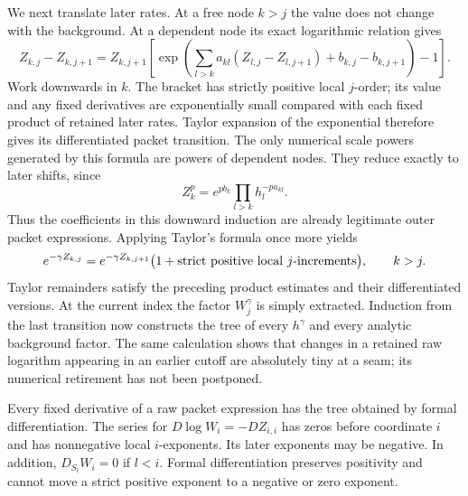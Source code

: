We next translate later rates.  At a free node $k>j$ the value does not
change with the background.  At a dependent node its exact logarithmic
relation gives
\begin{equation}
 Z_{k,j}-Z_{k,j+1}
 =Z_{k,j+1}\left[
 \exp\left(\sum_{l>k}a_{kl}(Z_{l,j}-Z_{l,j+1})
                   +b_{k,j}-b_{k,j+1}\right)-1\right].
 \label{eq:calculus-rate-difference}
\end{equation}
Work downwards in $k$.  The bracket has strictly positive local $j$-order;
its value and any fixed derivatives are exponentially small compared with
each fixed product of retained later rates.  Taylor expansion of the
exponential therefore gives its differentiated packet transition.
The only numerical scale powers generated by this formula are powers of
dependent nodes.  They reduce exactly to later shifts, since
\begin{equation}
 Z_k^p=e^{p b_k}\prod_{l>k}h_l^{-p a_{kl}}.
 \label{eq:calculus-dependent-power}
\end{equation}
Thus the coefficients in this downward induction are already legitimate
outer packet expressions.  Applying Taylor's formula once more yields
\begin{equation}
 e^{-\gamma Z_{k,j}}
 =e^{-\gamma Z_{k,j+1}}
       \bigl(1+\hbox{strict positive local $j$-increments}\bigr),
 \qquad k>j.
 \label{eq:calculus-later-shift}
\end{equation}
Taylor remainders satisfy the preceding product estimates and their
differentiated versions.  At the current index the factor $W_j^\gamma$
is simply extracted.  Induction from the last transition now constructs
the tree of every $h^\gamma$ and every analytic background factor.
The same calculation shows that changes in a retained raw logarithm
appearing in an earlier cutoff are absolutely tiny at a seam; its numerical
retirement has not been postponed.

\begin{lemma}
\label{lem:calculus-differentiation}
Every fixed derivative of a raw packet expression has the tree obtained by
formal differentiation.  The series for $D\log W_i=-DZ_{i,i}$ has zeros
before coordinate $i$ and has nonnegative local $i$-exponents.  Its later
exponents may be negative.  In addition,
$D_{S_l}W_i=0$ if $l<i$.  Formal differentiation preserves positivity and
cannot move a strict positive exponent to a negative or zero exponent.
\end{lemma}

